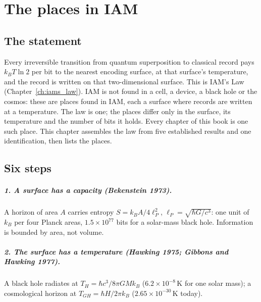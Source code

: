 \providecommand{\authornote}[1]{\footnote{\textbf{Author:} #1}}
\chapter{The places in IAM}\label{ch:surfaces}

\section*{The statement}
Every irreversible transition from quantum superposition to classical record pays $k_BT\ln2$ per bit to the nearest encoding surface, at that
surface's temperature, and the record is written on that two-dimensional surface. This is IAM's Law (Chapter~\ref{ch:iams_law}). IAM is not found in a cell, a device, a black hole or the cosmos: these are places found in
IAM, each a surface where records are written at a temperature. The law is one; the places differ only in the surface, its temperature and the
number of bits it holds. Every chapter of this book is one such place. This chapter assembles the law from five established results and one
identification, then lists the places.

\section{Six steps}
\paragraph{1. A surface has a capacity (Bekenstein 1973).} A horizon of area $A$ carries entropy $S=k_BA/4\ell_P^2$, $\ell_P=\sqrt{\hbar G/c^3}$:
one unit of $k_B$ per four Planck areas, $1.5\times10^{77}$ bits for a solar-mass black hole. Information is bounded by area, not volume.
\paragraph{2. The surface has a temperature (Hawking 1975; Gibbons and Hawking 1977).} A black hole radiates at $T_H=\hbar c^3/8\pi GMk_B$
($6.2\times10^{-8}$\,K for one solar mass); a cosmological horizon at $T_{GH}=\hbar H/2\pi k_B$ ($2.65\times10^{-30}$\,K today).
